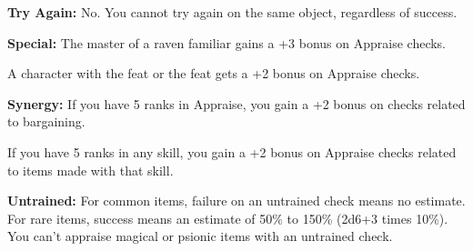 \textbf{Try Again:} No. You cannot try again on the same object, regardless of success.

\textbf{Special:} The master of a raven familiar gains a +3 bonus on Appraise checks.

A character with the  feat or the  feat gets a +2 bonus on Appraise checks.

\textbf{Synergy:} If you have 5 ranks in Appraise, you gain a +2 bonus on  checks related to bargaining.

If you have 5 ranks in any  skill, you gain a +2 bonus on Appraise checks related to items made with that  skill.

\textbf{Untrained:} For common items, failure on an untrained check means no estimate. For rare items, success means an estimate of 50\% to 150\% (2d6+3 times 10\%). You can't appraise magical or psionic items with an untrained check.